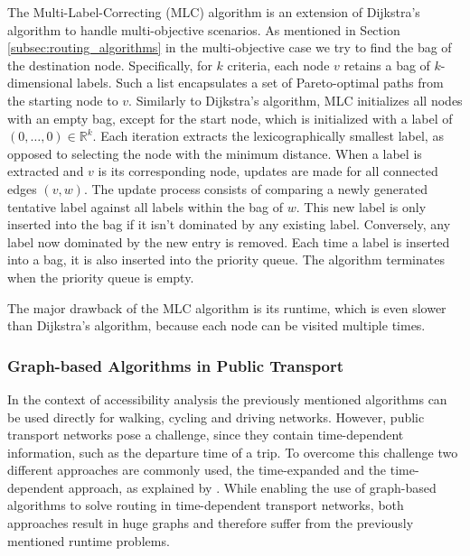 The Multi-Label-Correcting (MLC)  algorithm is an extension of Dijkstra's algorithm to handle multi-objective scenarios.
As mentioned in Section \ref{subsec:routing_algorithms} in the multi-objective case we try to find the bag of the destination node.
Specifically, for \(k\) criteria, each node \(v\) retains a bag of \(k\)-dimensional labels. Such a list encapsulates a set of Pareto-optimal paths from the starting node to \(v\).
Similarly to Dijkstra's algorithm, MLC initializes all nodes with an empty bag, except for the start node, which is initialized with a label of \( (0, \dots, 0) \in \mathbb{R}^k \).
Each iteration extracts the lexicographically smallest label, as opposed to selecting the node with the minimum distance.
When a label is extracted and \(v\) is its corresponding node, updates are made for all connected edges \( (v, w) \).
The update process consists of comparing a newly generated tentative label against all labels within the bag of \(w\).
This new label is only inserted into the bag if it isn't dominated by any existing label.
Conversely, any label now dominated by the new entry is removed.
Each time a label is inserted into a bag, it is also inserted into the priority queue.
The algorithm terminates when the priority queue is empty.

The major drawback of the MLC algorithm is its runtime, which is even slower than Dijkstra's algorithm, because each node can be visited multiple times.


\subsubsection{Graph-based Algorithms in Public Transport}
\label{subsubsec:graph_based_algorithms_in_public_transport}


In the context of accessibility analysis the previously mentioned algorithms can be used directly for walking, cycling and driving networks.
However, public transport networks pose a challenge, since they contain time-dependent information, such as the departure time of a trip.
To overcome this challenge two different approaches are commonly used, the time-expanded and the time-dependent approach, as explained by .
While enabling the use of graph-based algorithms to solve routing in time-dependent transport networks, both approaches result in huge graphs and therefore suffer from the previously mentioned runtime problems.

